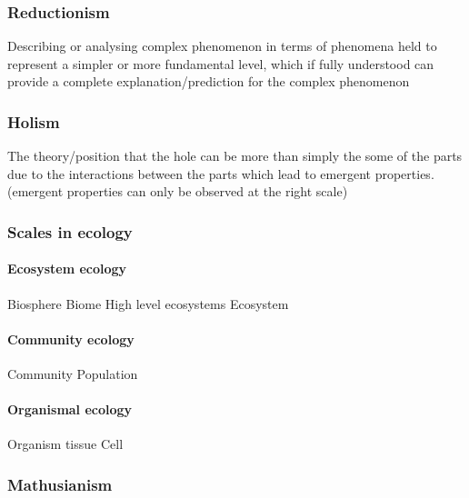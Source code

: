 \documentclass[]{article}
\let\oldparagraph\paragraph
\renewcommand{\paragraph}[1]{\oldparagraph{#1}\mbox{}}
\begin{document}
\hypertarget{reductionism}{%
\subsubsection{Reductionism}\label{reductionism}}

Describing or analysing complex phenomenon in terms of phenomena held to
represent a simpler or more fundamental level, which if fully understood
can provide a complete explanation/prediction for the complex phenomenon

\hypertarget{holism}{%
\subsubsection{Holism}\label{holism}}

The theory/position that the hole can be more than simply the some of
the parts due to the interactions between the parts which lead to
emergent properties. (emergent properties can only be observed at the
right scale)

\hypertarget{scales-in-ecology}{%
\subsubsection{Scales in ecology}\label{scales-in-ecology}}

\hypertarget{ecosystem-ecology}{%
\paragraph{Ecosystem ecology}\label{ecosystem-ecology}}

Biosphere Biome High level ecosystems Ecosystem

\hypertarget{community-ecology}{%
\paragraph{Community ecology}\label{community-ecology}}

Community Population

\hypertarget{organismal-ecology}{%
\paragraph{Organismal ecology}\label{organismal-ecology}}

Organism tissue Cell

\hypertarget{mathusianism}{%
\subsubsection{Mathusianism}\label{mathusianism}}
\end{document}
